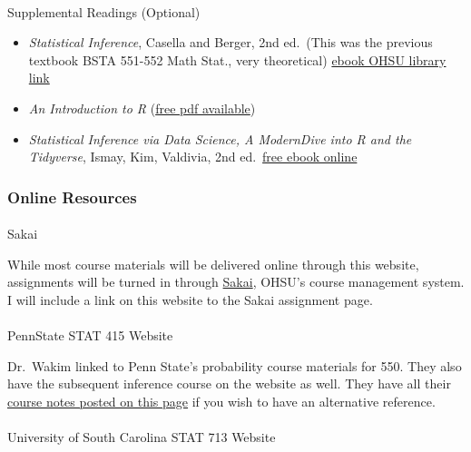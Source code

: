 \documentclass[
  letterpaper,
  DIV=11,
  numbers=noendperiod]{scrartcl}
\makeatletter
\let\oldparagraph\paragraph
\renewcommand{\paragraph}{
    \@ifstar
      \xxxParagraphStar
      \xxxParagraphNoStar
  }
\newcommand{\xxxParagraphStar}[1]{\oldparagraph*{#1}\mbox{}}
\newcommand{\xxxParagraphNoStar}[1]{\oldparagraph{#1}\mbox{}}
\makeatother
\begin{document}
\paragraph{Supplemental Readings
(Optional)}\label{supplemental-readings-optional}

\begin{itemize}
\item
  \emph{Statistical Inference}, Casella and Berger, 2nd ed.~(This was
  the previous textbook BSTA 551-552 Math Stat., very theoretical)
  \href{https://librarysearch.ohsu.edu/permalink/01ALLIANCE_OHSU/19jn9i0/alma99900537344401858}{ebook
  OHSU library link}
\item
  \emph{An Introduction to R}
  (\href{http://cran.r-project.org/manuals.html}{free pdf available})
\item
  \emph{Statistical Inference via Data Science, A ModernDive into R and
  the Tidyverse}, Ismay, Kim, Valdivia, 2nd
  ed.~\href{https://moderndive.com/v2/index.html}{free ebook online}
\end{itemize}

\subsubsection{Online Resources}\label{online-resources}

\paragraph{Sakai}\label{sakai}

While most course materials will be delivered online through this
website, assignments will be turned in through
\href{https://sakai.ohsu.edu/}{Sakai}, OHSU's course management system.
I will include a link on this website to the Sakai assignment page.~

\paragraph{PennState STAT 415 Website}\label{pennstate-stat-415-website}

Dr.~Wakim linked to Penn State's probability course materials for 550.
They also have the subsequent inference course on the website as well.
They have all their \href{https://online.stat.psu.edu/stat415/}{course
notes posted on this page} if you wish to have an alternative reference.

\paragraph{University of South Carolina STAT 713
Website}\label{university-of-south-carolina-stat-713-website}
\end{document}
